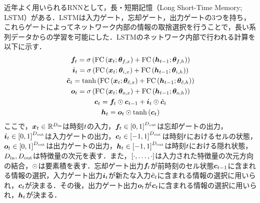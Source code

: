 近年よく用いられるRNNとして，長・短期記憶（Long Short-Time Memory; LSTM）\cite{hochreiter1997long}がある．LSTMは入力ゲート，忘却ゲート，出力ゲートの3つを持ち，これらゲートによってネットワーク内部の情報の取捨選択を行うことで，長い系列データからの学習を可能にした．LSTMのネットワーク内部で行われる計算を以下に示す．
\begin{gather}
    \bm{f}_{t} = \sigma\left(\text{FC}\left(\bm{x}_{t}; \bm{\theta}_{f, x}\right) + \text{FC}\left(\bm{h}_{t-1}; \bm{\theta}_{f, h}\right)\right) \\
    \bm{i}_{t} = \sigma\left(\text{FC}\left(\bm{x}_{t}; \bm{\theta}_{i, x}\right) + \text{FC}\left(\bm{h}_{t-1}; \bm{\theta}_{i, h}\right)\right) \\
    \tilde{\bm{c}}_{t} = \tanh\left(\text{FC}\left(\bm{x}_{t}; \bm{\theta}_{\tilde{c}, x}\right) + \text{FC}\left(\bm{h}_{t-1}; \bm{\theta}_{\tilde{c}, h}\right)\right) \\
    \bm{o}_{t} = \sigma\left(\text{FC}\left(\bm{x}_{t}; \bm{\theta}_{o, x}\right) + \text{FC}\left(\bm{h}_{t-1}; \bm{\theta}_{o, h}\right)\right) \\
    \bm{c}_{t} = \bm{f}_{t} \odot \bm{c}_{t-1} + \bm{i}_{t} \odot \tilde{\bm{c}}_{t} \\
    \bm{h}_{t} = \bm{o}_{t} \odot \tanh\left(\bm{c}_{t}\right)
\end{gather}
ここで，$\bm{x}_{t} \in \mathbb{R}^{D_{\text{in}}}$は時刻$t$の入力，$\bm{f}_{t} \in \left[0, 1\right]^{D_{\text{out}}}$は忘却ゲートの出力，$\bm{i}_{t} \in \left[0, 1\right]^{D_{\text{out}}}$は入力ゲートの出力，$\bm{c}_{t} \in \left[-1, 1\right]^{D_{\text{out}}}$は時刻$t$におけるセルの状態，$\bm{o}_{t} \in \left[0, 1\right]^{D_{\text{out}}}$は出力ゲートの出力，$\bm{h}_{t} \in \left[-1, 1\right]^{D_{\text{out}}}$は時刻$t$における隠れ状態，$D_{\text{in}}, D_{\text{out}}$は特徴量の次元を表す．また，$\left[\cdot, \ldots, \cdot\right]$は入力された特徴量の次元方向の結合，$\odot$は要素積を表す．忘却ゲート出力$\bm{f}_{t}$が前時刻のセル状態$\bm{c}_{t - 1}$に含まれる情報の選択，入力ゲート出力$\bm{i}_{t}$が新たな入力$\tilde{\bm{c}}_{t}$に含まれる情報の選択に用いられ，$\bm{c}_{t}$が決まる．その後，出力ゲート出力$\bm{o}_{t}$が$\bm{c}_{t}$に含まれる情報の選択に用いられ，$\bm{h}_{t}$が決まる．


